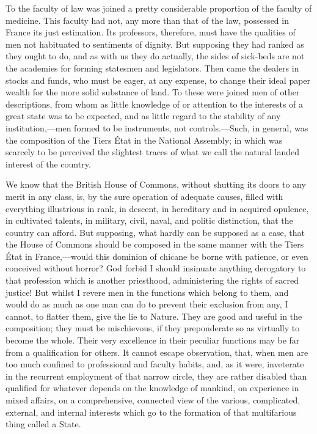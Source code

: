To the faculty of law was joined a pretty considerable proportion of the faculty of medicine. This faculty had not, any more than that of the law, possessed in France its just estimation. Its professors, therefore, must have the qualities of men not habituated to sentiments of dignity. But supposing they had ranked as they ought to do, and as with us they do actually, the sides of sick-beds are not the academies for forming statesmen and legislators. Then came the dealers in stocks and funds, who must be eager, at any expense, to change their ideal paper wealth for the more solid substance of land. To these were joined men of other descriptions, from whom as little knowledge of or attention to the interests of a great state was to be expected, and as little regard to the stability of any institution,—men formed to be instruments, not controls.—Such, in general, was the composition of the Tiers État in the National Assembly; in which was scarcely to be perceived the slightest traces of what we call the natural landed interest of the country.

We know that the British House of Commons, without shutting its doors to any merit in any class, is, by the sure operation of adequate causes, filled with everything illustrious in rank, in descent, in hereditary and in acquired opulence, in cultivated talents, in military, civil, naval, and politic distinction, that the country can afford. But supposing, what hardly can be supposed as a case, that the House of Commons should be composed in the same manner with the Tiers État in France,—would this dominion of chicane be borne with patience, or even conceived without horror? God forbid I should insinuate anything derogatory to that profession which is another priesthood, administering the rights of sacred justice! But whilst I revere men in the functions which belong to them, and would do as much as one man can do to prevent their exclusion from any, I cannot, to flatter them, give the lie to Nature. They are good and useful in the composition; they must be mischievous, if they preponderate so as virtually to become the whole. Their very excellence in their peculiar functions may be far from a qualification for others. It cannot escape observation, that, when men are too much confined to professional and faculty habits, and, as it were, inveterate in the recurrent employment of that narrow circle, they are rather disabled than qualified for whatever depends on the knowledge of mankind, on experience in mixed affairs, on a comprehensive, connected view of the various, complicated, external, and internal interests which go to the formation of that multifarious thing called a State.

